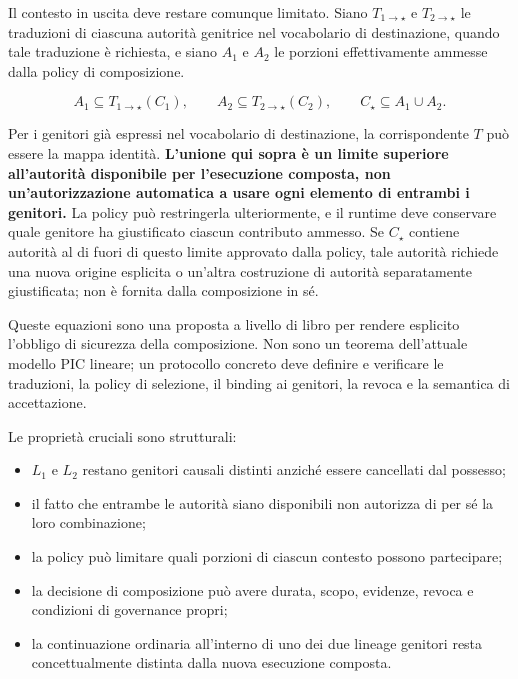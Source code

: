 \documentclass[10pt,oneside,openany]{book}
\begin{document}
Il contesto in uscita deve restare comunque limitato. Siano $T_{1\rightarrow\star}$ e $T_{2\rightarrow\star}$ le traduzioni di ciascuna autorità genitrice nel vocabolario di destinazione, quando tale traduzione è richiesta, e siano $A_1$ e $A_2$ le porzioni effettivamente ammesse dalla policy di composizione.
\begin{formulabox}
\[
A_1\subseteq T_{1\rightarrow\star}(C_1),\qquad
A_2\subseteq T_{2\rightarrow\star}(C_2),\qquad
C_\star\subseteq A_1\cup A_2.
\]
\end{formulabox}
Per i genitori già espressi nel vocabolario di destinazione, la corrispondente $T$ può essere la mappa identità. \textbf{L'unione qui sopra è un limite superiore all'autorità disponibile per l'esecuzione composta, non un'autorizzazione automatica a usare ogni elemento di entrambi i genitori.} La policy può restringerla ulteriormente, e il runtime deve conservare quale genitore ha giustificato ciascun contributo ammesso. Se $C_\star$ contiene autorità al di fuori di questo limite approvato dalla policy, tale autorità richiede una nuova origine esplicita o un'altra costruzione di autorità separatamente giustificata; non è fornita dalla composizione in sé.

Queste equazioni sono una proposta a livello di libro per rendere esplicito l'obbligo di sicurezza della composizione. Non sono un teorema dell'attuale modello PIC lineare; un protocollo concreto deve definire e verificare le traduzioni, la policy di selezione, il binding ai genitori, la revoca e la semantica di accettazione.

Le proprietà cruciali sono strutturali:
\begin{itemize}
\item $L_1$ e $L_2$ restano genitori causali distinti anziché essere cancellati dal possesso;
\item il fatto che entrambe le autorità siano disponibili non autorizza di per sé la loro combinazione;
\item la policy può limitare quali porzioni di ciascun contesto possono partecipare;
\item la decisione di composizione può avere durata, scopo, evidenze, revoca e condizioni di governance propri;
\item la continuazione ordinaria all'interno di uno dei due lineage genitori resta concettualmente distinta dalla nuova esecuzione composta.
\end{itemize}
\end{document}
